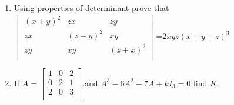 \documentclass[12pt,-letter paper]{article}
\providecommand{\mydet}[1]{\ensuremath{\begin{vmatrix}#1\end{vmatrix}}}
\providecommand{\myvec}[1]{\ensuremath{\begin{bmatrix}#1\end{bmatrix}}}
\providecommand{\brak}[1]{\ensuremath{\left(#1\right)}}
\begin{document}
\begin{enumerate}
\item Using properties of determinant prove that \\
		$\mydet{
			\brak{x+y}^{2} & zx &  zy\\
			zx & \brak{z+y}^{2} & xy\\
			zy & xy & \brak{z+x}^{2}\\
		}$=$2xyz\brak{x+y+z}^{3}$
   \item  If $A=\myvec{
		   1 & 0 & 2 \\
		   0  & 2 & 1 \\
		   2 & 0 & 3 \\
	}$.and $A^3-6A^2+7A+kI_3=0$  find $K$.
\end{enumerate}
\end{document}

